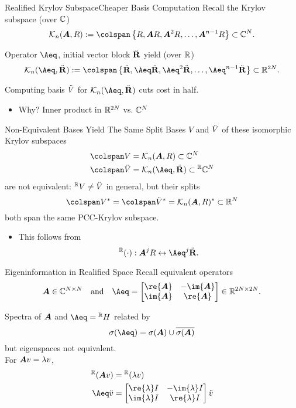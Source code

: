 \documentclass[serif]{beamer}
\begin{document}
\begin{frame}{Realified Krylov Subspace}{Cheaper Basis Computation}
 Recall the Krylov subspace  (over $\mathbb{C}$)
 \[ 
   \krylov{n}{\A}{R}:= \colspan\left\{R,\A R,\A^2R,\ldots,\A^{n-1}R\right\}
 	\subset\C^N.
 \]
 
\bigskip
Operator $\Aeq$, initial vector
 block ${\ddot{\textbf{\textup{R}}}}$ yield (over $\mathbb{R}$)
 \[ 
    \krylov{n}{\Aeq}{\Req}:= 
    \colspan\left\{\Req,\Aeq \Req,\Aeq^2\Req,\ldots,\Aeq^{n-1}\Req\right\}
  	\subset\R^{2N}.
 \]
 
 \bigskip
 Computing basis $\ddot{V}$ for $\krylov{n}{\Aeq}{\Req}$ cuts cost in half.
 \begin{itemize}
 \item Why? Inner product in $\mathbb{R}^{2N}$ vs. $\mathbb{C}^N$
 
 \end{itemize}
 \end{frame}


\begin{frame}{Non-Equivalent Bases Yield The Same Split}
Bases $V$ and $\ddot{V}$ of these isomorphic Krylov subspaces
\begin{align*}
    \colspan V &= \krylov{n}{\A}{R} \subset\C^N\\
 	\colspan \Veq &= \krylov{n}{\Aeq}{\Req}\subset\lsup{\R}{\C^N}
 \end{align*}
 are not equivalent:  $\lsup{\R}{V}\neq \Veq$ in general, but
 their splits 
 \[
 \colspan V^* = \colspan \Veq^* = \krylov{n}{\A}{R}^*\subset\R^N
 \]
 both span the same PCC-Krylov subspace.
 \begin{itemize}
 \item This follows from \[\lsup{\R}{(\cdot)}:\A^jR \leftrightarrow \Aeq^j\Req.\]
 \end{itemize}
 \end{frame}
 
 \begin{frame}{Eigeninformation in Realified Space}
 Recall equivalent operators 
 \[
 \A \in\C^{N\times N} 
 \quad\text{and}\quad  
 \Aeq = \mat{\re{\A} & -\im{\A}\\ \im{\A} & \re{\A} }\in\R^{2N\times 2N}. 
 \]

\medskip 
Spectra of $\bm{A}$ and $\Aeq = \lsup{\R}{H}$ related by
\[
\sigma(\Aeq) = \sigma(\A) \cup \conj{\sigma(\A)}
\]
but eigenspaces not equivalent.\\ For $\bm{A} v = \lambda v$,
\begin{align*}
\lsup{\R}{(\A v)} &= \lsup{\R}{(\lambda v)}\\
\Aeq\veq &= \mat{\re{\lambda}I &-\im{\lambda}I\\ \im{\lambda}I & \re{\lambda}I}\veq
\end{align*}
 \end{frame}
\end{document}
